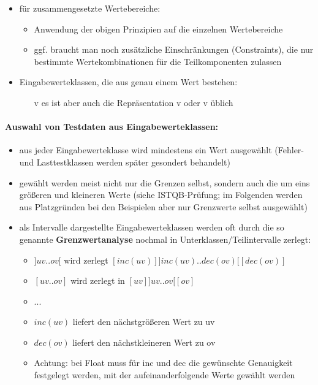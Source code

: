 \begin{itemize}
\begin{itemize}
	\end{itemize}
	\item für zusammengesetzte Wertebereiche:
	\begin{itemize}
		\item Anwendung der obigen Prinzipien auf die einzelnen Wertebereiche
		\item ggf. braucht man noch zusätzliche Einschränkungen (Constraints), die nur bestimmte Wertekombinationen für die Teilkomponenten zulassen
	\end{itemize}
	\item Eingabewerteklassen, die aus genau einem Wert bestehen:
	\begin{itemize}
		\item [v] es ist aber auch die Repräsentation {v} oder v üblich
	\end{itemize}
\end{itemize}

\paragraph{Auswahl von Testdaten aus Eingabewerteklassen:}

\begin{itemize}
	\item aus jeder Eingabewerteklasse wird mindestens ein Wert ausgewählt (Fehler- und Lasttestklassen werden später gesondert behandelt) 
	\item gewählt werden meist nicht nur die Grenzen selbst, sondern auch die um eins größeren und kleineren Werte (siehe ISTQB-Prüfung; im Folgenden werden aus Platzgründen bei den Beispielen aber nur Grenzwerte selbst ausgewählt)
	\item als Intervalle dargestellte Eingabewerteklassen werden oft durch die so genannte \textbf{Grenzwertanalyse} nochmal in Unterklassen/Teilintervalle zerlegt:
	\begin{itemize}
		\item $]uv..ov[$ wird zerlegt $[inc(uv)] ]inc(uv)..dec(ov)[ [dec(ov)]$
		\item $[uv..ov]$ wird zerlegt in $[uv] ]uv..ov[ [ov]$
		\item ...
		\item $inc(uv)$ liefert den nächstgrößeren Wert zu uv
		\item $dec(ov)$ liefert den nächstkleineren Wert zu ov
		\item Achtung: bei Float muss für inc und dec die gewünschte Genauigkeit festgelegt werden, mit der aufeinanderfolgende Werte gewählt werden
	\end{itemize}
\end{itemize}

